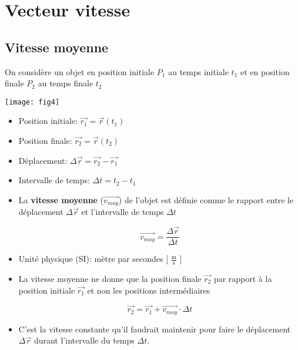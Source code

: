 \documentclass[
    11pt,
    a4paper,
    oneside,
    headinlcude, footinclude,
    twoside,
]{report}
\renewcommand{\vec}[1]{\overrightarrow{#1}}
\begin{document}
\section{Vecteur vitesse}
\label{sec:vecteur_vitesse}

\subsection{Vitesse moyenne}
\label{sub:vitesse_moyenne}

On considère un objet en position initiale $P_{1}$ au temps initiale $t_{1}$
et en position finale $P_{2}$ au temps finale $t_{2}$

\begin{center}
\texttt{[image: fig4]}
\end{center}

\begin{itemize}
\item Position initiale: $\vec{r_{1}} = \vec r (t_{1})$
\item Position finale: $\vec{r_{2}} = \vec r (t_{2})$
\item Déplacement: $\Delta \vec r = \vec{r_{2}} - \vec{r_{1}}$
\item Intervalle de temps: $\Delta t = t_{2} - t_{1}$
\end{itemize}


\begin{itemize}
\item La \textbf{vitesse moyenne} ($\vec{v_{moy}}$) de l'objet est définie
comme le rapport entre le déplacement $\Delta \vec r$ et l'intervalle
de temps $\Delta t$

\begin{equation}
\vec{v_{moy}} = \frac{\Delta \vec r}{\Delta t} 
\end{equation}

\item Unité physique (SI): mètre par secondes 
[ $\frac{\textrm{m}}{\textrm{s}}$ ]

\item La vitesse moyenne ne donne que la position finale $\vec{r_{2}}$ par
rapport à la position initiale $\vec{r_{1}}$ et non les positions
intermédiaires 

\begin{equation}
\vec{r_{2}} = \vec{r_{1}} + \vec{v_{moy}} \cdot \Delta t
\end{equation}
        
\item C'est  la vitesse constante qu'il faudrait maintenir pour faire le
déplacement $\Delta \vec r$ durant l'intervalle du temps $\Delta t$.
\end{itemize}
\end{document}
